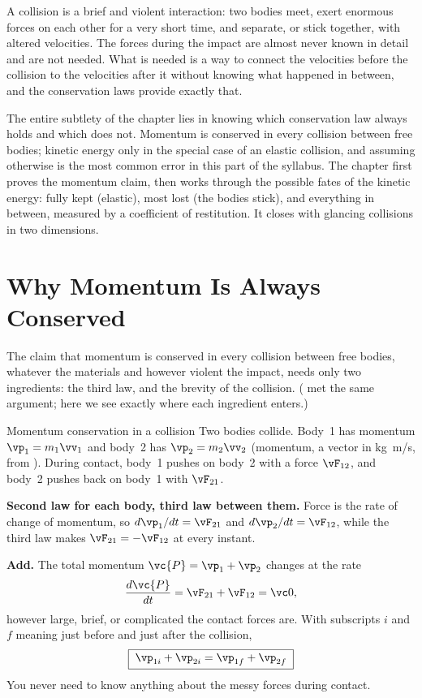 \label{ch:collisions}

A collision is a brief and violent interaction: two bodies meet, exert enormous forces on each other for a
very short time, and separate, or stick together, with altered velocities. The forces during the impact are
almost never known in detail and are not needed. What is needed is a way to connect the velocities before
the collision to the velocities after it without knowing what happened in between, and the conservation laws
provide exactly that.

The entire subtlety of the chapter lies in knowing which conservation law always holds and which does
not. Momentum is conserved in every collision between free bodies; kinetic energy only in the special
case of an elastic collision, and assuming otherwise is the most common error in this part of the
syllabus. The chapter first proves the momentum claim, then works through the possible fates of the
kinetic energy: fully kept (elastic), most lost (the bodies stick), and everything in between, measured
by a coefficient of restitution. It closes with glancing collisions in two dimensions.

\section{Why Momentum Is Always Conserved}

The claim that momentum is conserved in every collision between free bodies, whatever the materials and
however violent the impact, needs only two ingredients: the third law, and the brevity of the collision.
( met the same argument; here we see exactly where each ingredient enters.)

\begin{derivbox}{Momentum conservation in a collision}
Two bodies collide. Body~1 has momentum $\vp_1=m_1\vv_1$ and body~2 has $\vp_2=m_2\vv_2$ (momentum, a
vector in \si{kg.m/s}, from ). During contact, body~1 pushes on body~2 with a force
$\vF_{12}$, and body~2 pushes back on body~1 with $\vF_{21}$.

 \textbf{Second law for each body, third law between them.} Force is the rate of change of
momentum, so $d\vp_1/dt=\vF_{21}$ and $d\vp_2/dt=\vF_{12}$, while the third law makes
$\vF_{21}=-\vF_{12}$ at every instant.

 \textbf{Add.} The total momentum $\vc{P}=\vp_1+\vp_2$ changes at the rate
\[
\frac{d\vc{P}}{dt}=\vF_{21}+\vF_{12}=\vc0,
\]
however large, brief, or complicated the contact forces are. With subscripts $i$ and $f$ meaning just
before and just after the collision,
\[
\boxed{\;\vp_{1i}+\vp_{2i}=\vp_{1f}+\vp_{2f}\;}
\]
You never need to know anything about the messy forces during contact.
\end{derivbox}


